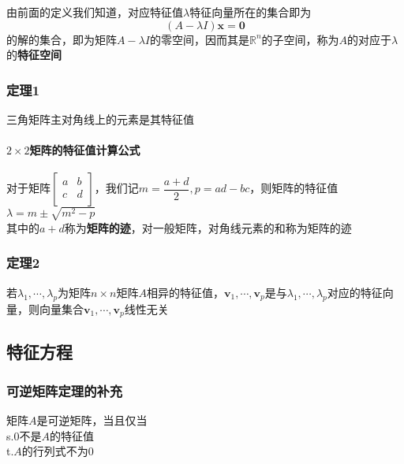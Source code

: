 \documentclass{article}
\newcommand{\ve}{\boldsymbol}
\begin{document}
\begin{CJK}{UTF8}{gkai}
由前面的定义我们知道，对应特征值$\lambda$特征向量所在的集合即为
\[(A-\lambda I )\ve{x} = \ve{0}\]
的解的集合，即为矩阵$A-\lambda I$的零空间，因而其是$\mathbb{R}^n$的子空间，称为$A$的对应于$\lambda$的\textbf{特征空间}\\

\subsubsection{定理1}

三角矩阵主对角线上的元素是其特征值\\

\paragraph{$2\times 2$矩阵的特征值计算公式\\}

对于矩阵$\begin{bmatrix}a&b\\c&d\\\end{bmatrix}$，我们记$m = \dfrac{a+d}{2},p = ad - bc$，则矩阵的特征值$\lambda = m \pm \sqrt{m^2 - p}$\\

其中的$a+d$称为\textbf{矩阵的迹}，对一般矩阵，对角线元素的和称为矩阵的迹\\

\subsubsection{定理2}

若$\lambda_1,\cdots,\lambda_p$为矩阵$n\times n$矩阵$A$相异的特征值，$\ve{v}_1,\cdots,\ve{v}_p$是与$\lambda_1,\cdots,\lambda_p$对应的特征向量，则向量集合$\ve{v}_1,\cdots,\ve{v}_p$线性无关\\

\subsection{特征方程}

\subsubsection{可逆矩阵定理的补充}
矩阵$A$是可逆矩阵，当且仅当\\

s.$0$不是$A$的特征值\\

t.$A$的行列式不为$0$\\


\end{CJK}
\end{document}
